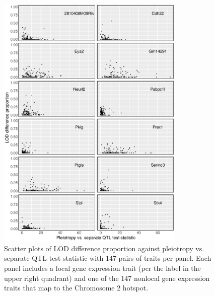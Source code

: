 \documentclass{article}
\begin{document}
\begin{figure}
    \centering
    \includegraphics[width = 0.8\textwidth]{../Rmd/12local-facet_grid-no-strip.eps}
    \caption{Scatter plots of LOD difference proportion against pleiotropy vs. separate QTL test statistic with 147 pairs of traits per panel. Each panel includes a local gene expression trait (per the label in the upper right quadrant) and one of the 147 nonlocal gene expression traits that map to the Chromosome 2 hotspot.}
    \label{fig:nothnf4a-12}
\end{figure}
\end{document}
